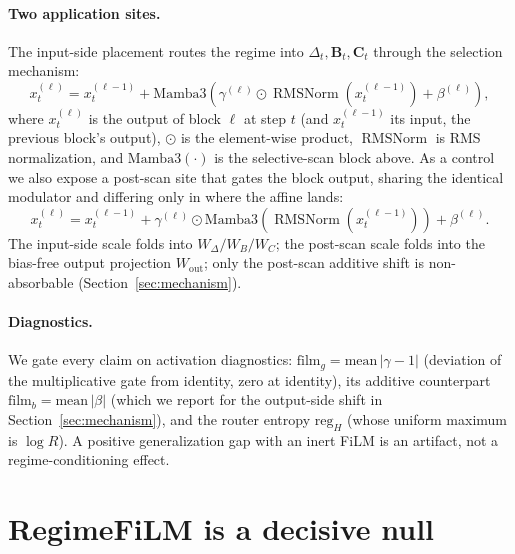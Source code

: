 \documentclass{article}
\newcommand{\filmG}{\mathrm{film}_g}
\newcommand{\filmB}{\mathrm{film}_b}
\newcommand{\regH}{\mathrm{reg}_H}
\DeclareMathOperator{\RMSNorm}{RMSNorm}
\begin{document}
\paragraph{Two application sites.} The input-side placement routes the regime into $\Delta_t,\mathbf{B}_t,\mathbf{C}_t$ through the selection mechanism:
\begin{equation}
 x_t^{(\ell)} = x_t^{(\ell-1)} + \mathrm{Mamba3}\!\left(\gamma^{(\ell)} \odot \RMSNorm(x_t^{(\ell-1)}) + \beta^{(\ell)}\right), \tag{input-side}
\end{equation}
where $x_t^{(\ell)}$ is the output of block $\ell$ at step $t$ (and $x_t^{(\ell-1)}$ its input, the previous block's output), $\odot$ is the element-wise product, $\RMSNorm$ is RMS normalization, and $\mathrm{Mamba3}(\cdot)$ is the selective-scan block above. As a control we also expose a post-scan site that gates the block output, sharing the identical modulator and differing only in where the affine lands:
\begin{equation}
 x_t^{(\ell)} = x_t^{(\ell-1)} + \gamma^{(\ell)} \odot \mathrm{Mamba3}\!\left(\RMSNorm(x_t^{(\ell-1)})\right) + \beta^{(\ell)}. \tag{post-scan}
\end{equation}
The input-side scale folds into $W_\Delta/W_B/W_C$; the post-scan scale folds into the bias-free output projection $W_{\mathrm{out}}$; only the post-scan additive shift is non-absorbable (Section~\ref{sec:mechanism}).

\paragraph{Diagnostics.} We gate every claim on activation diagnostics: $\filmG=\mathrm{mean}\,|\gamma-1|$ (deviation of the multiplicative gate from identity, zero at identity), its additive counterpart $\filmB=\mathrm{mean}\,|\beta|$ (which we report for the output-side shift in Section~\ref{sec:mechanism}), and the router entropy $\regH$ (whose uniform maximum is $\log R$). A positive generalization gap with an inert FiLM is an artifact, not a regime-conditioning effect.

\section{RegimeFiLM is a decisive null}\label{sec:null}
\end{document}
